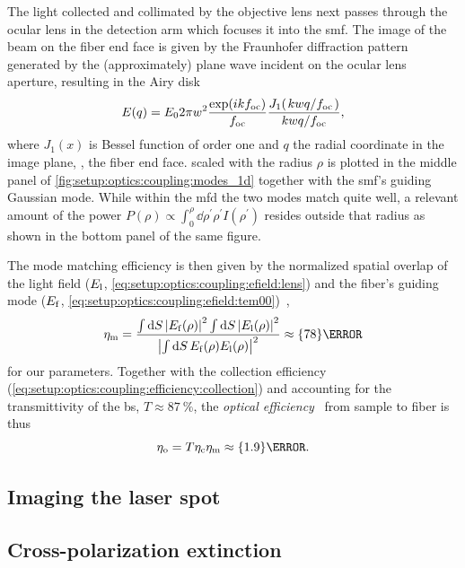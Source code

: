 The light collected and collimated by the objective lens next passes through the ocular lens in the detection arm which focuses it into the \gls{smf}.
The image of the beam on the fiber end face is given by the Fraunhofer diffraction pattern generated by the (approximately) plane wave incident on the ocular lens aperture,
resulting in the Airy disk~\cite{Hecht2017}
\begin{equation}\label{eq:setup:optics:coupling:airy}
    E(q) = E_0 2\pi w^2\frac{\exp(\i k \foc)}{\foc} \frac{J_1(\flatfrac{kwq}{\foc})}{\flatfrac{kwq}{\foc}},
\end{equation}
where $J_1(x)$ is Bessel function of order one and $q$ the radial coordinate in the image plane, \ie, the fiber end face.
 scaled with the radius $\rho$ is plotted in the middle panel of \cref{fig:setup:optics:coupling:modes_1d} together with the \gls{smf}'s guiding Gaussian mode.
While within the \gls{mfd} the two modes match quite well, a relevant amount of the power $P(\rho)\propto \int_0^{\rho}\dd{\rho^{\prime}} \rho^{\prime} I(\rho^{\prime})$ resides outside that radius as shown in the bottom panel of the same figure.

The mode matching efficiency is then given by the normalized spatial overlap of the light field ($E_{\mathrm{l}}$, \cref{eq:setup:optics:coupling:efield:lens}) and the fiber's guiding mode ($E_{\mathrm{f}}$, \cref{eq:setup:optics:coupling:efield:tem00})~\cite{Paschotta2005},
\begin{equation}\label{eq:setup:optics:coupling:efficiency:mode_matching}
    \eta_{\mr{m}} = \frac{\int\dd{S}\abs{E_{\mr{f}}(\rho)}^2\int\dd{S}\abs{E_{\mr{l}}(\rho)}^2}{\abs{\int\dd{S} E_{\mr{f}}(\rho) E_{\mr{l}}(\rho)}^2} \approx\qty{78}{\percent}
\end{equation}
for our parameters.
Together with the collection efficiency (\cref{eq:setup:optics:coupling:efficiency:collection}) and accounting for the transmittivity of the \gls{bs}, $T\approx\qty{87}{\percent}$,
the \emph{optical efficiency}~\cite{Sze2007} from sample to fiber is thus
\begin{equation}
    \eta_{\mr{o}} = T\eta_{\mr{c}}\eta_{\mr{m}}\approx\qty{1.9}{\percent}.
\end{equation}

\subsection{Imaging the laser spot}\label{subsec:setup:optics:coupling:imaging}

\subsection{Cross-polarization extinction}\label{subsec:sec:optics:coupling:rejection}
